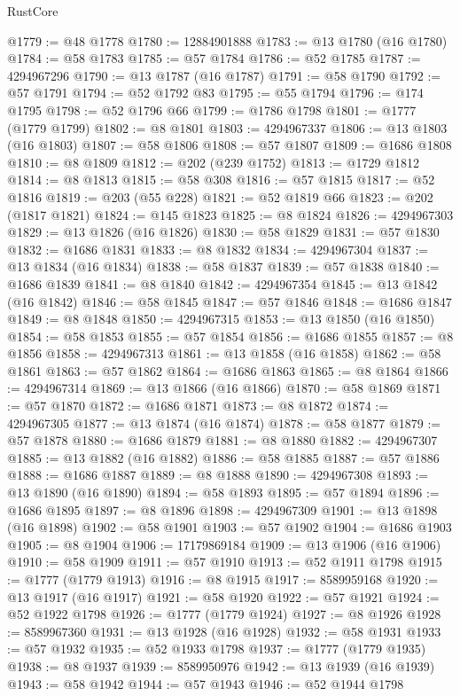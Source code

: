 \begin{lexlean}{RustCore}
\begin{coremodule}
@1779 := @48 @1778
@1780 := 12884901888
@1783 := @13 @1780 (@16 @1780)
@1784 := @58 @1783
@1785 := @57 @1784
@1786 := @52 @1785
@1787 := 4294967296
@1790 := @13 @1787 (@16 @1787)
@1791 := @58 @1790
@1792 := @57 @1791
@1794 := @52 @1792 @83
@1795 := @55 @1794
@1796 := @174 @1795
@1798 := @52 @1796 @66
@1799 := @1786 @1798
@1801 := @1777 (@1779 @1799)
@1802 := @8 @1801
@1803 := 4294967337
@1806 := @13 @1803 (@16 @1803)
@1807 := @58 @1806
@1808 := @57 @1807
@1809 := @1686 @1808
@1810 := @8 @1809
@1812 := @202 (@239 @1752)
@1813 := @1729 @1812
@1814 := @8 @1813
@1815 := @58 @308
@1816 := @57 @1815
@1817 := @52 @1816
@1819 := @203 (@55 @228)
@1821 := @52 @1819 @66
@1823 := @202 (@1817 @1821)
@1824 := @145 @1823
@1825 := @8 @1824
@1826 := 4294967303
@1829 := @13 @1826 (@16 @1826)
@1830 := @58 @1829
@1831 := @57 @1830
@1832 := @1686 @1831
@1833 := @8 @1832
@1834 := 4294967304
@1837 := @13 @1834 (@16 @1834)
@1838 := @58 @1837
@1839 := @57 @1838
@1840 := @1686 @1839
@1841 := @8 @1840
@1842 := 4294967354
@1845 := @13 @1842 (@16 @1842)
@1846 := @58 @1845
@1847 := @57 @1846
@1848 := @1686 @1847
@1849 := @8 @1848
@1850 := 4294967315
@1853 := @13 @1850 (@16 @1850)
@1854 := @58 @1853
@1855 := @57 @1854
@1856 := @1686 @1855
@1857 := @8 @1856
@1858 := 4294967313
@1861 := @13 @1858 (@16 @1858)
@1862 := @58 @1861
@1863 := @57 @1862
@1864 := @1686 @1863
@1865 := @8 @1864
@1866 := 4294967314
@1869 := @13 @1866 (@16 @1866)
@1870 := @58 @1869
@1871 := @57 @1870
@1872 := @1686 @1871
@1873 := @8 @1872
@1874 := 4294967305
@1877 := @13 @1874 (@16 @1874)
@1878 := @58 @1877
@1879 := @57 @1878
@1880 := @1686 @1879
@1881 := @8 @1880
@1882 := 4294967307
@1885 := @13 @1882 (@16 @1882)
@1886 := @58 @1885
@1887 := @57 @1886
@1888 := @1686 @1887
@1889 := @8 @1888
@1890 := 4294967308
@1893 := @13 @1890 (@16 @1890)
@1894 := @58 @1893
@1895 := @57 @1894
@1896 := @1686 @1895
@1897 := @8 @1896
@1898 := 4294967309
@1901 := @13 @1898 (@16 @1898)
@1902 := @58 @1901
@1903 := @57 @1902
@1904 := @1686 @1903
@1905 := @8 @1904
@1906 := 17179869184
@1909 := @13 @1906 (@16 @1906)
@1910 := @58 @1909
@1911 := @57 @1910
@1913 := @52 @1911 @1798
@1915 := @1777 (@1779 @1913)
@1916 := @8 @1915
@1917 := 8589959168
@1920 := @13 @1917 (@16 @1917)
@1921 := @58 @1920
@1922 := @57 @1921
@1924 := @52 @1922 @1798
@1926 := @1777 (@1779 @1924)
@1927 := @8 @1926
@1928 := 8589967360
@1931 := @13 @1928 (@16 @1928)
@1932 := @58 @1931
@1933 := @57 @1932
@1935 := @52 @1933 @1798
@1937 := @1777 (@1779 @1935)
@1938 := @8 @1937
@1939 := 8589950976
@1942 := @13 @1939 (@16 @1939)
@1943 := @58 @1942
@1944 := @57 @1943
@1946 := @52 @1944 @1798

\end{coremodule}
\end{lexlean}
